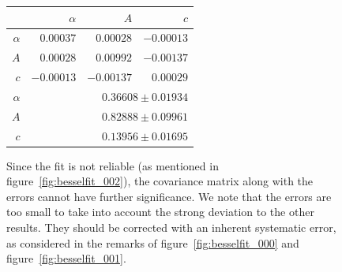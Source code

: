 \begin{figure}
\caption{
    Since the fit is not reliable (as mentioned in figure~\ref{fig:besselfit_002}), 
    the covariance matrix along with the errors cannot have further significance.
    We note that the errors are too small to take into account the strong deviation to the
    other results. They should be corrected with an inherent systematic error, as considered in
    the remarks of figure~\ref{fig:besselfit_000} and figure~\ref{fig:besselfit_001}.
}
 \begin{tabular}{|r|r|r|r|}
 \hline 
\cellcolor{tabcolor}&\cellcolor{tabcolor}$\alpha$&\cellcolor{tabcolor}$A$&\cellcolor{tabcolor}$c$\\ \hline 
 \cellcolor{tabcolor}$\alpha$&$0.00037$ &$0.00028$ &$-0.00013$ \\ 
\cellcolor{tabcolor}$A$&$0.00028$ &$0.00992$ &$-0.00137$ \\ 
\cellcolor{tabcolor}$c$&$-0.00013$ &$-0.00137$ &$0.00029$ \\ \hline \hline
\cellcolor{tabcolor}$\alpha$&\multicolumn{3}{r|}{$0.36608 \pm 0.01934$ }\\ 
\cellcolor{tabcolor}$A$&\multicolumn{3}{r|}{$0.82888 \pm 0.09961$ }\\ 
\cellcolor{tabcolor}$c$&\multicolumn{3}{r|}{$0.13956 \pm 0.01695$ }\\ 
\hline
\end{tabular}
\end{figure}
\newpage
\clearpage
